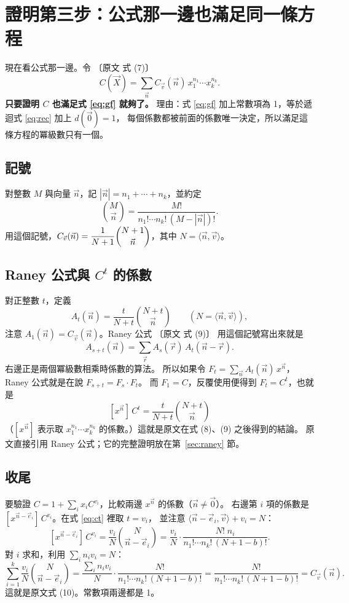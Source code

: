 \documentclass[11pt,a4paper]{article}
\newcommand{\vn}{\vec n}
\newcommand{\vv}{\vec v}
\newcommand{\vr}{\vec r}
\newcommand{\ve}{\vec e}
\newcommand{\vX}{\vec X}
\newcommand{\ip}[2]{\langle #1,#2\rangle}
\newcommand{\Cv}{C_{\vv}}
\newcommand{\paper}[1]{{\small\color{gray!70!black}〔原文 #1〕}}
\begin{document}
\section{證明第三步：公式那一邊也滿足同一條方程}

現在看公式那一邊。令 \paper{式 (7)}
\[
C(\vX)=\sum_{\vn}\Cv(\vn)\,x_1^{n_1}\cdots x_k^{n_k}.
\]
\textbf{只要證明 $C$ 也滿足式 \eqref{eq:gf} 就夠了。}
理由：式 \eqref{eq:gf} 加上常數項為 1，等於遞迴式 \eqref{eq:rec} 加上 $d(\vec0)=1$，
每個係數都被前面的係數唯一決定，所以滿足這條方程的冪級數只有一個。

\subsection{記號}
對整數 $M$ 與向量 $\vn$，記 $|\vn|=n_1+\cdots+n_k$，並約定
\[
\binom{M}{\vn}=\frac{M!}{n_1!\cdots n_k!\,(M-|\vn|)!}.
\]
用這個記號，$\Cv(\vn)=\dfrac{1}{N+1}\dbinom{N+1}{\vn}$，其中 $N=\ip{\vn}{\vv}$。

\subsection{Raney 公式與 $C^t$ 的係數}

對正整數 $t$，定義
\[
A_t(\vn)=\frac{t}{N+t}\binom{N+t}{\vn}\qquad(N=\ip{\vn}{\vv}),
\]
注意 $A_1(\vn)=\Cv(\vn)$。Raney 公式 \paper{式 (9)} 用這個記號寫出來就是
\[
A_{s+t}(\vn)=\sum_{\vr}A_s(\vr)\,A_t(\vn-\vr).
\]
右邊正是兩個冪級數相乘時係數的算法。
所以如果令 $F_t=\sum_{\vn}A_t(\vn)\,x^{\vn}$，Raney 公式就是在說 $F_{s+t}=F_s\cdot F_t$。
而 $F_1=C$，反覆使用便得到 $F_t=C^t$，也就是
\begin{equation}\label{eq:ct}
\boxed{\;[x^{\vn}]\,C^t=\frac{t}{N+t}\binom{N+t}{\vn}\;}
\end{equation}
（$[x^{\vn}]$ 表示取 $x_1^{n_1}\cdots x_k^{n_k}$ 的係數。）這就是原文在式 (8)、(9) 之後得到的結論。
原文直接引用 Raney 公式；它的完整證明放在第~\ref{sec:raney} 節。

\subsection{收尾}

要驗證 $C=1+\sum_i x_iC^{v_i}$，比較兩邊 $x^{\vn}$ 的係數（$\vn\neq\vec0$）。
右邊第 $i$ 項的係數是 $[x^{\vn-\ve_i}]\,C^{v_i}$。在式 \eqref{eq:ct} 裡取 $t=v_i$，
並注意 $\ip{\vn-\ve_i}{\vv}+v_i=N$：
\[
[x^{\vn-\ve_i}]\,C^{v_i}=\frac{v_i}{N}\binom{N}{\vn-\ve_i}
=\frac{v_i}{N}\cdot\frac{N!\;n_i}{n_1!\cdots n_k!\,(N+1-b)!}.
\]
對 $i$ 求和，利用 $\sum_i n_iv_i=N$：
\[
\sum_{i=1}^{k}\frac{v_i}{N}\binom{N}{\vn-\ve_i}
=\frac{\sum_i n_iv_i}{N}\cdot\frac{N!}{n_1!\cdots n_k!\,(N+1-b)!}
=\frac{N!}{n_1!\cdots n_k!\,(N+1-b)!}=\Cv(\vn).
\]
這就是原文式 (10)。常數項兩邊都是 1。
\end{document}
